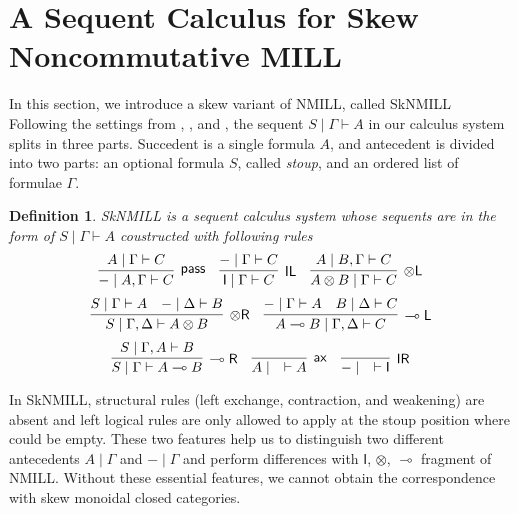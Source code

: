 \documentclass[submission,copyright,creativecommons]{eptcs}
\newtheorem{defn}[theorem]{Definition}
\newcommand{\tl}{\otimes \mathsf{L}}
\newcommand{\tr}{\otimes \mathsf{R}}
\newcommand{\lright}{\multimap \mathsf{R}}
\newcommand{\lleft}{\multimap \mathsf{L}}
\newcommand{\pass}{\mathsf{pass}}
\newcommand{\unitl}{\mathsf{IL}}
\newcommand{\unitr}{\mathsf{IR}}
\newcommand{\ax}{\mathsf{ax}}
\newcommand{\ot}{\otimes}
\newcommand{\lolli}{\multimap}
\newcommand{\I}{\mathsf{I}}
\newcommand{\niccolo}[1]{{\color{red}\textbf{Niccol{\`o}: }#1}}
\begin{document}
\section{A Sequent Calculus for Skew Noncommutative MILL}\label{sec2}
In this section, we introduce a skew variant of NMILL, called SkNMILL
Following the settings from \cite{uustalu:sequent:2018}, \cite{uustalu:deductive:nodate}, and \cite{uustalu:proof:nodate}, the sequent $S \mid \Gamma \vdash A$ in our calculus system splits in three parts.
Succedent is a single formula $A$, and antecedent is divided into two parts: an optional formula $S$, called \emph{stoup}, and an ordered list of formulae $\Gamma$.
\begin{defn}
  \emph{SkNMILL} is a sequent calculus system whose sequents are in the form of $S \mid \Gamma \vdash A$ coustructed with following rules
  \begin{displaymath}
    \infer[\pass]{- \mid A , \Gamma \vdash C}{A \mid \Gamma \vdash C}
    \quad
    \infer[\unitl]{\I \mid \Gamma \vdash C}{- \mid \Gamma \vdash C}
    \quad
    \infer[\tl]{A \ot B \mid \Gamma \vdash C}{A \mid B , \Gamma \vdash C}
  \end{displaymath}
  \begin{displaymath}
    \infer[\tr]{S \mid \Gamma , \Delta \vdash A \ot B}{
      S \mid \Gamma \vdash A
      &
      - \mid \Delta \vdash B
    }
    \quad
    \infer[\lleft]{A \lolli B \mid \Gamma , \Delta \vdash C}{
      - \mid \Gamma \vdash A
      &
      B \mid \Delta \vdash C
      }
  \end{displaymath}
  \begin{displaymath}
    \infer[\lright]{S \mid \Gamma \vdash A \lolli B}{S \mid \Gamma , A \vdash B}
    \quad
    \infer[\ax]{A \mid \quad \vdash A}{}
    \quad
    \infer[\unitr]{- \mid \quad \vdash \I}{}
  \end{displaymath}
\end{defn}



In SkNMILL, structural rules (left exchange, contraction, and weakening) are absent and left logical rules are only allowed to apply at the stoup position where could be empty.
These two features help us to distinguish two different antecedents $A \mid \Gamma$ and $- \mid \Gamma$ and perform differences with $\I$, $\ot$, $\lolli$ fragment of NMILL.
Without these essential features, we cannot obtain the correspondence with skew monoidal closed categories.
\end{document}
